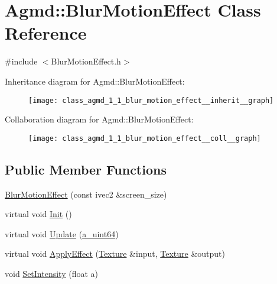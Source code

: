 \hypertarget{class_agmd_1_1_blur_motion_effect}{\section{Agmd\+:\+:Blur\+Motion\+Effect Class Reference}
\label{class_agmd_1_1_blur_motion_effect}
}


{\ttfamily \#include $<$Blur\+Motion\+Effect.\+h$>$}



Inheritance diagram for Agmd\+:\+:Blur\+Motion\+Effect\+:\nopagebreak
\begin{figure}[H]
\begin{center}
\leavevmode
\texttt{[image: class\_agmd\_1\_1\_blur\_motion\_effect\_\_inherit\_\_graph]}
\end{center}
\end{figure}


Collaboration diagram for Agmd\+:\+:Blur\+Motion\+Effect\+:\nopagebreak
\begin{figure}[H]
\begin{center}
\leavevmode
\texttt{[image: class\_agmd\_1\_1\_blur\_motion\_effect\_\_coll\_\_graph]}
\end{center}
\end{figure}
\subsection*{Public Member Functions}
\begin{DoxyCompactItemize}
\item 
\hyperlink{class_agmd_1_1_blur_motion_effect_a54709bea123932d59d977bad8ff2a1dc}{Blur\+Motion\+Effect} (const ivec2 \&screen\+\_\+size)
\item 
virtual void \hyperlink{class_agmd_1_1_blur_motion_effect_a81459fa84cce7b8fb93c134a19217218}{Init} ()
\item 
virtual void \hyperlink{class_agmd_1_1_blur_motion_effect_ac94fcea7a83905333956f22f719c1805}{Update} (\hyperlink{_common_defines_8h_a6c5192ec3c55d6e5b13d2dbaa082bdea}{a\+\_\+uint64})
\item 
virtual void \hyperlink{class_agmd_1_1_blur_motion_effect_a6286d0c1aea5f9560fa0da698995addb}{Apply\+Effect} (\hyperlink{class_agmd_1_1_texture}{Texture} \&input, \hyperlink{class_agmd_1_1_texture}{Texture} \&output)
\item 
void \hyperlink{class_agmd_1_1_blur_motion_effect_ac695d37a19e536b7e24d9c41ca42730f}{Set\+Intensity} (float a)
\end{DoxyCompactItemize}
